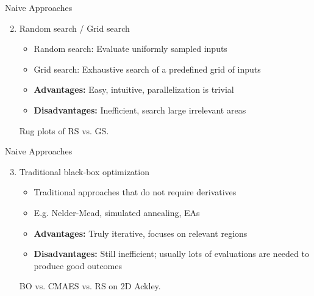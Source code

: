 \documentclass[11pt,compress,t,notes=noshow, xcolor=table]{beamer}
\begin{document}
\begin{framev}{Naive Approaches}
\begin{enumerate}
\setcounter{enumi}{1}
\item Random search / Grid search
\begin{itemize}
\item Random search: Evaluate uniformly sampled inputs
\item Grid search: Exhaustive search of a predefined grid of inputs
\item \textbf{Advantages: } Easy, intuitive, parallelization is trivial
\item \textbf{Disadvantages: } Inefficient, search large irrelevant areas
\end{itemize}
\vfill
{}
{}
\begin{footnotesize}\begin{center}
Rug plots of RS vs. GS.
\end{center}\end{footnotesize}
\end{enumerate}
\end{framev}


\begin{framev}{Naive Approaches}
\begin{enumerate}
\setcounter{enumi}{2}
\item Traditional black-box optimization
\begin{itemize}
\item Traditional approaches that do not require derivatives
\item E.g. Nelder-Mead, simulated annealing, EAs
\item \textbf{Advantages:} Truly iterative, focuses on relevant regions
\item \textbf{Disadvantages:} Still inefficient; usually lots of evaluations are needed to produce good outcomes
\end{itemize}
\vfill
{}
\begin{footnotesize}\begin{center}
BO vs. CMAES vs. RS on 2D Ackley.
\end{center}\end{footnotesize}
\end{enumerate}
\end{framev}

\endlecture
\end{document}
